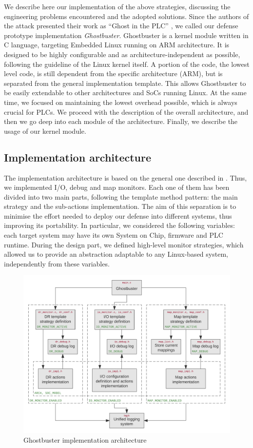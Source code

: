 We describe here our implementation of the above strategies, discussing the engineering problems encountered and the adopted solutions.
Since the authors of the attack presented their work as ``Ghost in the PLC'' \cite{ghostplc}, we called our defense prototype implementation \emph{Ghostbuster}.
Ghostbuster is a kernel module written in C language, targeting Embedded Linux running on ARM architecture.
It is designed to be highly configurable and as architecture-independent as possible, following the guideline of the Linux kernel itself.
A portion of the code, \ie the lowest level code, is still dependent from the specific architecture (\eg ARM), but is separated from the general implementation template.
This allows Ghostbuster to be easily extendable to other architectures and SoCs running Linux. At the same time, we focused on maintaining the lowest overhead possible,
which is always crucial for PLCs. We proceed with the description of the overall architecture, and then we go deep into each module of the architecture.
Finally, we describe the usage of our kernel module.


\subsection{Implementation architecture}

The implementation architecture is based on the general one described in . Thus, we implemented I/O, debug and map monitors.
Each one of them has been divided into two main parts, following the template method pattern: the main strategy and the sub-actions implementation.
The aim of this separation is to minimise the effort needed to deploy our defense into different systems, thus improving its portability.
In particular, we considered the following variables: each target system may have its own System on Chip, firmware and PLC runtime.
During the design part, we defined high-level monitor strategies, which allowed us to provide an abstraction adaptable to any Linux-based system,
independently from these variables.
\begin{figure}[h]
\centerline{\includegraphics[width=\textwidth]{res/def-impl}}
\caption{Ghostbuster implementation architecture \label{fig:def-impl}}
\end{figure}

